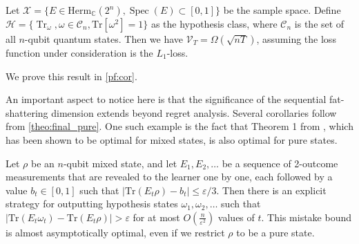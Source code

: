 \begin{corollary}\label{cor:bis}
    Let $\mathcal{X} = \{E\in\mathrm{Herm}_{\mathbb{C}}(2^n), \operatorname{Spec}(E)\subset[0,1]\}$ be the sample space. Define $\mathcal{H}=\{\operatorname{Tr}_\omega, \omega\in\mathcal C_n, \mathrm{Tr}[\omega^2]=1\}$ as the hypothesis class, where $\mathcal{C}_n$ is the set of all $n$-qubit quantum states. Then we have $\mathcal{V}_T=\Omega(\sqrt{nT})$, assuming the loss function under consideration is the $L_1$-loss.
\end{corollary}
We prove this result in \cref{pf:cor}.

An important aspect to notice here is that the significance of the sequential fat-shattering dimension extends beyond regret analysis. Several corollaries follow from \cref{theo:final_pure}. One such example is the fact that Theorem 1 from \citet{aaronson2019online}, which has been shown to be optimal for mixed states, is also optimal for pure states.

\begin{corollary}
\label{cor:mistake_bds}
Let $\rho$ be an $n$-qubit mixed state, and let $E_1, E_2, \dots$ be a sequence of 2-outcome measurements that are revealed to the learner one by one, each followed by a value $b_t \in [0,1]$ such that $\lvert \mathrm{Tr}(E_t \rho) - b_t \rvert \leq \varepsilon/3$. Then there is an explicit strategy for outputting hypothesis states $\omega_1, \omega_2, \dots$ such that $\lvert \mathrm{Tr}(E_t \omega_t) - \mathrm{Tr}(E_t \rho) \rvert > \varepsilon$ for at most $O\left(\frac{n}{\varepsilon^2}\right)$ values of $t$. This mistake bound is almost asymptotically optimal, even if we restrict $\rho$ to be a pure state.
\end{corollary}

